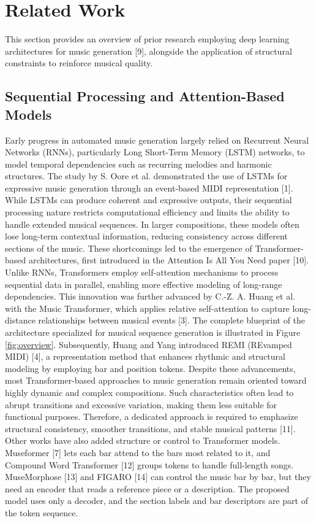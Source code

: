 \documentclass[conference,a4paper]{IEEEtran}
\begin{document}
\section{Related Work}
This section provides an overview of prior research employing deep learning architectures for music generation [9], alongside the application of structural constraints to reinforce musical quality.

\subsection{Sequential Processing and Attention-Based Models}
Early progress in automated music generation largely relied on Recurrent Neural Networks (RNNs), particularly Long Short-Term Memory (LSTM) networks, to model temporal dependencies such as recurring melodies and harmonic structures. The study by S. Oore et al. demonstrated the use of LSTMs for expressive music generation through an event-based MIDI representation [1]. While LSTMs can produce coherent and expressive outputs, their sequential processing nature restricts computational efficiency and limits the ability to handle extended musical sequences. In larger compositions, these models often lose long-term contextual information, reducing consistency across different sections of the music. These shortcomings led to the emergence of Transformer-based architectures, first introduced in the Attention Is All You Need paper [10]. Unlike RNNs, Transformers employ self-attention mechanisms to process sequential data in parallel, enabling more effective modeling of long-range dependencies. This innovation was further advanced by C.-Z. A. Huang et al. with the Music Transformer, which applies relative self-attention to capture long-distance relationships between musical events [3].
The complete blueprint of the architecture specialized for musical sequence generation is illustrated in Figure \ref{fig:overview}. Subsequently, Huang and Yang introduced REMI (REvamped MIDI) [4], a representation method that enhances rhythmic and structural modeling by employing bar and position tokens.
Despite these advancements, most Transformer-based approaches to music generation remain oriented toward highly dynamic and complex compositions. Such characteristics often lead to abrupt transitions and excessive variation, making them less suitable for functional purposes. Therefore, a dedicated approach is required to emphasize structural consistency, smoother transitions, and stable musical patterns [11]. Other works have also added structure or control to Transformer models. Museformer [7] lets each bar attend to the bars most related to it, and Compound Word Transformer [12] groups tokens to handle full-length songs. MuseMorphose [13] and FIGARO [14] can control the music bar by bar, but they need an encoder that reads a reference piece or a description. The proposed model uses only a decoder, and the section labels and bar descriptors are part of the token sequence.
\end{document}
